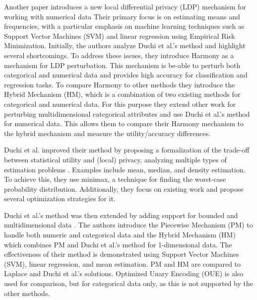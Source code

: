Another paper introduces a new local differential privacy (LDP) mechanism for working with numerical data \citep{nguyen_collecting_2016}
Their primary focus is on estimating means and frequencies, with a particular emphasis on machine learning techniques such as Support Vector Machines (SVM) and linear regression using Empirical Risk Minimization.
Initially, the authors analyze Duchi et al.'s method \citep{duchi_privacy_2013} and highlight several shortcomings.
To address these issues, they introduce Harmony as a mechanism for LDP perturbation.
This mechanism is be-able to perturb both categorical and numerical data and provides high accuracy for classification and regression tasks.
To compare Harmony to other methods they introduce the Hybrid Mechanism (HM), which is a combination of two existing methods for categorical and numerical data.
For this purpose they extend other work \citep{bassily_local_2015} for perturbing multidimensional categorical attributes and use Duchi et al.'s method for numerical data.
This allows them to compare their Harmony mechanism to the hybrid mechanism and measure the utility/accuracy differences.

Duchi et al. improved their method by proposing a formalization of the trade-off between statistical utility and (local) privacy, analyzing multiple types of estimation problems \citep{duchi_minimax_2017}.
Examples include mean, median, and density estimation.
To achieve this, they use minimax, a technique for finding the worst-case probability distribution.
Additionally, they focus on existing work and propose several optimization strategies for it.

Duchi et al.'s method was then extended by adding support for bounded and multidimensional data \citep{wang_collecting_2019}.
The authors introduce the Piecewise Mechanism (PM) to handle both numeric and categorical data and the Hybrid Mechanism (HM) which combines PM and Duchi et al.'s method for 1-dimensional data.
The effectiveness of their method is demonstrated using Support Vector Machines (SVM), linear regression, and mean estimation.
PM and HM are compared to Laplace and Duchi et al.'s solutions.
Optimized Unary Encoding (OUE) \citep{wang_locally_nodate} is also used for comparison, but for categorical data only, as this is not supported by the other methods.


